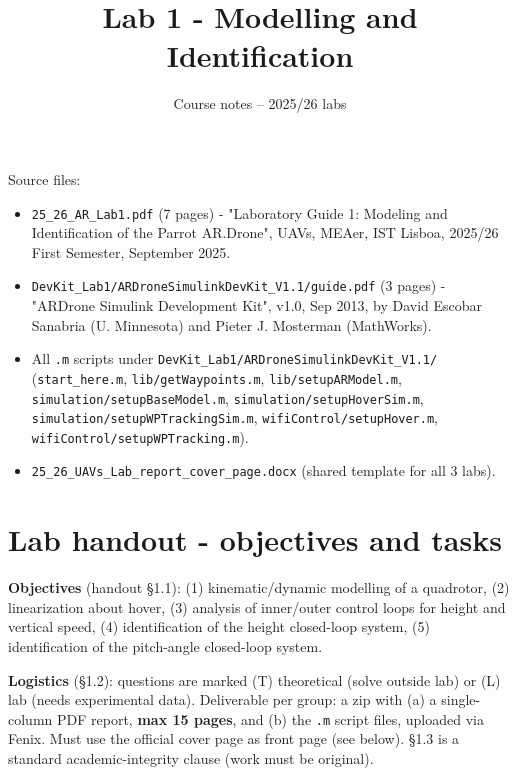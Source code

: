 \documentclass[11pt]{article}
\title{Lab 1 - Modelling and Identification}
\author{Course notes -- 2025/26 labs}
\date{}
\begin{document}
\maketitle
\tableofcontents
\vspace{1em}

Source files:
\begin{itemize}
\item \texttt{25\_\allowbreak{}26\_\allowbreak{}AR\_\allowbreak{}Lab1.pdf} (7 pages) - "Laboratory Guide 1: Modeling and Identification of the Parrot AR.Drone", UAVs, MEAer, IST Lisboa, 2025/26 First Semester, September 2025.
\item \texttt{DevKit\_\allowbreak{}Lab1/\allowbreak{}ARDroneSimulinkDevKit\_\allowbreak{}V1.1/guide.pdf} (3 pages) - "ARDrone Simulink Development Kit", v1.0, Sep 2013, by David Escobar Sanabria (U. Minnesota) and Pieter J. Mosterman (MathWorks).
\item All \texttt{.m} scripts under \texttt{DevKit\_\allowbreak{}Lab1/\allowbreak{}ARDroneSimulinkDevKit\_\allowbreak{}V1.1/} (\texttt{start\_\allowbreak{}here.m}, \texttt{lib/\allowbreak{}getWaypoints.m}, \texttt{lib/\allowbreak{}setupARModel.m}, \texttt{simulation/\allowbreak{}setupBaseModel.m}, \texttt{simulation/\allowbreak{}setupHoverSim.m}, \texttt{simulation/\allowbreak{}setupWPTrackingSim.m}, \texttt{wifiControl/\allowbreak{}setupHover.m}, \texttt{wifiControl/\allowbreak{}setupWPTracking.m}).
\item \texttt{25\_\allowbreak{}26\_\allowbreak{}UAVs\_\allowbreak{}Lab\_\allowbreak{}report\_\allowbreak{}cover\_\allowbreak{}page.docx} (shared template for all 3 labs).
\end{itemize}

\section{Lab handout - objectives and tasks}

\textbf{Objectives} (handout §1.1): (1) kinematic/dynamic modelling of a quadrotor, (2) linearization about hover, (3) analysis of inner/outer control loops for height and vertical speed, (4) identification of the height closed-loop system, (5) identification of the pitch-angle closed-loop system.

\textbf{Logistics} (§1.2): questions are marked (T) theoretical (solve outside lab) or (L) lab (needs experimental data). Deliverable per group: a zip with (a) a single-column PDF report, \textbf{max 15 pages}, and (b) the \texttt{.m} script files, uploaded via Fenix. Must use the official cover page as front page (see below). §1.3 is a standard academic-integrity clause (work must be original).
\end{document}
